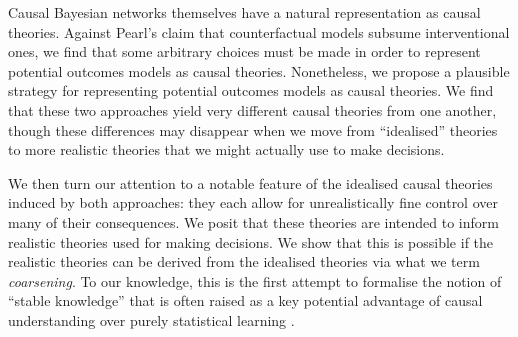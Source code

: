 Causal Bayesian networks themselves have a natural representation as causal theories. Against Pearl's claim that counterfactual models subsume interventional ones, we find that some arbitrary choices must be made in order to represent potential outcomes models as causal theories. Nonetheless, we propose a plausible strategy for representing potential outcomes models as causal theories. We find that these two approaches yield very different causal theories from one another, though these differences may disappear when we move from ``idealised'' theories to more realistic theories that we might actually use to make decisions.

We then turn our attention to a notable feature of the idealised causal theories induced by both approaches: they each allow for unrealistically fine control over many of their consequences. We posit that these theories are intended to inform realistic theories used for making decisions. We show that this is possible if the realistic theories can be derived from the idealised theories via what we term \emph{coarsening}. To our knowledge, this is the first attempt to formalise the notion of ``stable knowledge'' that is often raised as a key potential advantage of causal understanding over purely statistical learning \citep{arjovsky_invariant_2019,pearl_causality:_2009,rubin_causal_2005}.



